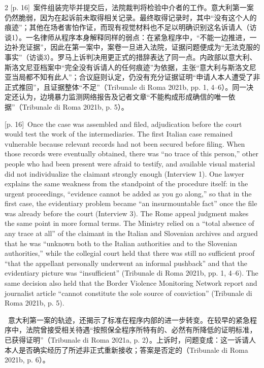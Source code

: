 \documentclass[10pt,a4paper]{article}
\begin{document}
\begin{paracol}{2}
{\scriptsize\color{gray} [p. 16]}\ 案件组装完毕并提交后，法院裁判将检验中介者的工作。意大利第一案仍然脆弱，因为在起诉前未取得相关记录。最终取得记录时，其中“没有这个人的痕迹”；其他在场者害怕作证，而现有视觉材料也不足以明确识别这名诉请人（访谈1）。一名律师从程序本身解释同样的弱点：在紧急程序中，“不能一边推进，一边补充证据”，因此在第一案中，案卷一旦进入法院，证据问题便成为“无法克服的事实”（访谈3）。罗马上诉判决用更正式的措辞表达了同一点。内政部以意大利、斯洛文尼亚档案中“完全没有诉请人的任何痕迹”为依据，主张“意大利与斯洛文尼亚当局都不知有此人”；合议庭则认定，仍没有充分证据证明“申请人本人遭受了非正式推回”，且证据整体“不足”（Tribunale di Roma 2021b, pp. 1, 4–6）。同一决定还认为，边境暴力监测网络报告及记者文章“不能构成形成确信的唯一依据”（Tribunale di Roma 2021b, p. 5）。\par
\switchcolumn
{\scriptsize\color{gray} [p. 16]}\ Once the case was assembled and filed, adjudication before the court would test the work of the intermediaries. The first Italian case remained vulnerable because relevant records had not been secured before filing. When those records were eventually obtained, there was “no trace of this person,” other people who had been present were afraid to testify, and available visual material did not individualize the claimant strongly enough (Interview 1). One lawyer explains the same weakness from the standpoint of the procedure itself: in the urgent proceedings, “evidence cannot be added as you go along,” so that in the first case, the evidentiary problem became “an insurmountable fact” once the file was already before the court (Interview 3). The Rome appeal judgment makes the same point in more formal terms. The Ministry relied on a “total absence of any trace at all” of the claimant in the Italian and Slovenian archives and argued that he was “unknown both to the Italian authorities and to the Slovenian authorities,” while the collegial court held that there was still no sufficient proof “that the appellant personally underwent an informal pushback” and that the evidentiary picture was “insufficient” (Tribunale di Roma 2021b, pp. 1, 4–6). The same decision also held that the Border Violence Monitoring Network report and journalist article “cannot constitute the sole source of conviction” (Tribunale di Roma 2021b, p. 5).\par
\switchcolumn*
{\scriptsize\color{gray} [p. 17]}\ 意大利第一案的轨迹，还揭示了标准在程序内部的进一步转变。在较早的紧急程序中，法院曾接受相关待遇“按照保全程序所特有的、必然有所降低的证明标准，已获得证明”（Tribunale di Roma 2021a, p. 2）。上诉时，问题变成：这一诉请人本人是否确实经历了所述非正式重新接收；答案是否定的（Tribunale di Roma 2021b, p. 6）。\par

\end{paracol}
\end{document}
